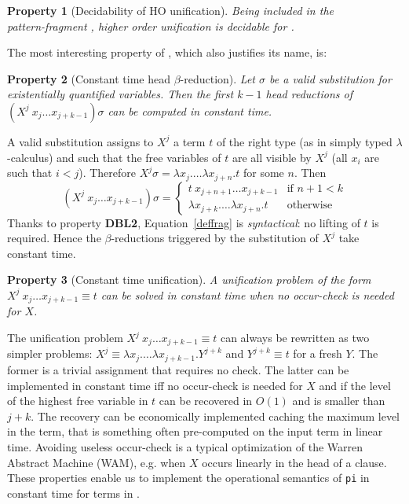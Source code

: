 \documentclass{llncs}
\newtheorem{myprop}{Property}
\begin{document}
\begin{myprop}[Decidability of HO unification]
Being \rff{} included in the\\pattern-fragment \Ll{}, higher order unification is
decidable for \rff{}.
\end{myprop}

The most interesting property of \rff{}, which also justifies its name, is:

\begin{myprop}[Constant time head $\beta$-reduction]
Let $\sigma$ be a \emph{valid} substitution for existentially quantified variables. Then the first $k-1$ head reductions of $(X^j~x_j \ldots x_{j+k-1}) \sigma$ can be computed in constant time.
\end{myprop}

A valid substitution assigns to $X^j$ a term $t$ of the right type (as in simply
typed $\lambda$-calculus) and such that the free variables of $t$ are
all visible by $X^j$ (all $x_i$ are such that $i < j$).
Therefore $X^j \sigma = \lambda x_j. \ldots \lambda x_{j+n}.t$ for some $n$.
Then
\begin{equation}\label{deffrag}(X^j~x_j \ldots x_{j+k-1}) \sigma
 = \left\{ \begin{array}{ll}
t~x_{j+n+1} \ldots x_{j+k-1} & \mbox{if $n+1 < k$} \\
\lambda x_{j+k}. \ldots \lambda x_{j+n}.t & \mbox{otherwise}
      \end{array} \right.\end{equation}
Thanks to property \textbf{DBL2}, Equation~\ref{deffrag} is
\emph{syntactical}: no lifting of $t$ is required.
Hence the $\beta$-reductions triggered by the substitution of $X^j$ take
constant time.

\begin{myprop}[Constant time unification]
A unification problem of the form $X^j~x_j\ldots x_{j+k-1} \equiv t$
can be solved in constant time when no occur-check is needed for $X$.
\end{myprop}

The unification problem $X^j~x_j\ldots x_{j+k-1} \equiv t$ can always be
rewritten as two simpler problems: $X^j \equiv \lambda x_j. \ldots \lambda x_{j+k-1}. Y^{j+k}$ and $Y^{j+k} \equiv t$ for a fresh $Y$.
The former is a trivial assignment that requires no check.
The latter can be implemented in constant time iff no occur-check is needed
for $X$ and if the level of the highest free variable in $t$ can be recovered
in $O(1)$ and is smaller than $j+k$. The recovery can be economically
implemented caching the maximum level in the term, that is something often
pre-computed on the input term in linear time.
Avoiding useless occur-check is a typical optimization of the Warren Abstract
Machine (WAM), e.g. when $X$ occurs linearly in the head of a clause.
These properties enable us to implement the operational semantics of \verb+pi+
in constant time for terms in \rff{}.
\end{document}
